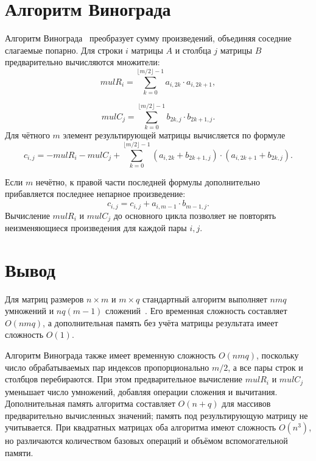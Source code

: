 \documentclass{bmstu}
\begin{document}
\section{Алгоритм Винограда}
Алгоритм Винограда~\cite{anisimov2021matrix} преобразует сумму произведений,
объединяя соседние слагаемые попарно. Для строки $i$ матрицы $A$ и столбца $j$ матрицы $B$
предварительно вычисляются множители:
\begin{equation}
	\mathit{mulR}_i = \sum_{k=0}^{\lfloor m/2\rfloor-1}
	a_{i,2k}\cdot a_{i,2k+1},
	\label{eq:winograd-precompute-1}
\end{equation}

\begin{equation}
	\mathit{mulC}_j = \sum_{k=0}^{\lfloor m/2\rfloor-1}
	b_{2k,j}\cdot b_{2k+1,j}.
	\label{eq:winograd-precompute-2}
\end{equation}
Для чётного $m$ элемент результирующей матрицы вычисляется по формуле
\begin{equation}
	c_{i,j} =
	-\mathit{mulR}_i-\mathit{mulC}_j+
	\sum_{k=0}^{\lfloor m/2\rfloor-1}
	\left(a_{i,2k}+b_{2k+1,j}\right)
	\cdot
	\left(a_{i,2k+1}+b_{2k,j}\right).
\end{equation}

Если $m$ нечётно, к правой части последней формулы дополнительно прибавляется
последнее непарное произведение:
\begin{equation}
	c_{i,j} = c_{i,j} + a_{i,m-1}\cdot b_{m-1,j}.
\end{equation}
Вычисление $\mathit{mulR}_i$ и $\mathit{mulC}_j$ до основного цикла позволяет не повторять
неизменяющиеся произведения для каждой пары $i,j$.

\section{Вывод}
Для матриц размеров $n\times m$ и $m\times q$ стандартный алгоритм выполняет
$nmq$ умножений и $nq(m-1)$ сложений~\cite{anisimov2021matrix}. Его временная сложность составляет
$O(nmq)$, а дополнительная память без учёта матрицы результата имеет
сложность $O(1)$.

Алгоритм Винограда также имеет временную сложность $O(nmq)$, поскольку
число обрабатываемых пар индексов пропорционально $m/2$, а все пары
строк и столбцов перебираются. При этом предварительное вычисление
$\mathit{mulR}_i$ и $\mathit{mulC}_j$ уменьшает число умножений, добавляя
операции сложения и вычитания.
Дополнительная память алгоритма составляет $O(n+q)$ для массивов
предварительно вычисленных значений; память под результирующую матрицу не
учитывается. При квадратных матрицах оба алгоритма имеют сложность
$O(n^3)$, но различаются количеством базовых операций и объёмом
вспомогательной памяти.
\end{document}
